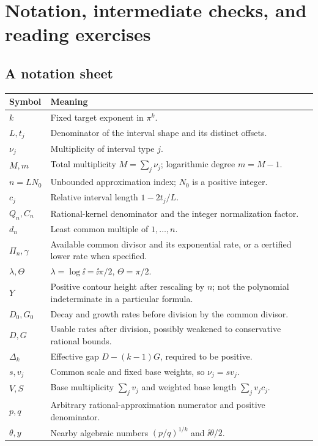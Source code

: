 \section{Notation, intermediate checks, and reading exercises}
\label{app:reader}

\subsection{A notation sheet}

\begin{longtable}{p{25mm}p{112mm}}
\toprule
Symbol&Meaning\\
\midrule
\endhead
\(k\)&Fixed target exponent in \(\pi^k\).\\
\(L,t_j\)&Denominator of the interval shape and its distinct offsets.\\
\(\nu_j\)&Multiplicity of interval type \(j\).\\
\(M,m\)&Total multiplicity \(M=\sum_j\nu_j\); logarithmic degree \(m=M-1\).\\
\(n=LN_0\)&Unbounded approximation index; \(N_0\) is a positive integer.\\
\(c_j\)&Relative interval length \(1-2t_j/L\).\\
\(Q_n,C_n\)&Rational-kernel denominator and the integer normalization factor.\\
\(d_n\)&Least common multiple of \(1,\ldots,n\).\\
\(\Pi_n,\gamma\)&Available common divisor and its exponential rate, or a certified lower rate when specified.\\
\(\lambda,\Theta\)&\(\lambda=\log\ii=\ii\pi/2\), \(\Theta=\pi/2\).\\
\(Y\)&Positive contour height after rescaling by \(n\); not the polynomial indeterminate in a particular formula.\\
\(D_0,G_0\)&Decay and growth rates before division by the common divisor.\\
\(D,G\)&Usable rates after division, possibly weakened to conservative rational bounds.\\
\(\Delta_k\)&Effective gap \(D-(k-1)G\), required to be positive.\\
\(s,v_j\)&Common scale and fixed base weights, so \(\nu_j=sv_j\).\\
\(V,S\)&Base multiplicity \(\sum_jv_j\) and weighted base length \(\sum_jv_jc_j\).\\
\(p,q\)&Arbitrary rational-approximation numerator and positive denominator.\\
\(\theta,y\)&Nearby algebraic numbers \((p/q)^{1/k}\) and \(\ii\theta/2\).\\
\bottomrule
\end{longtable}

